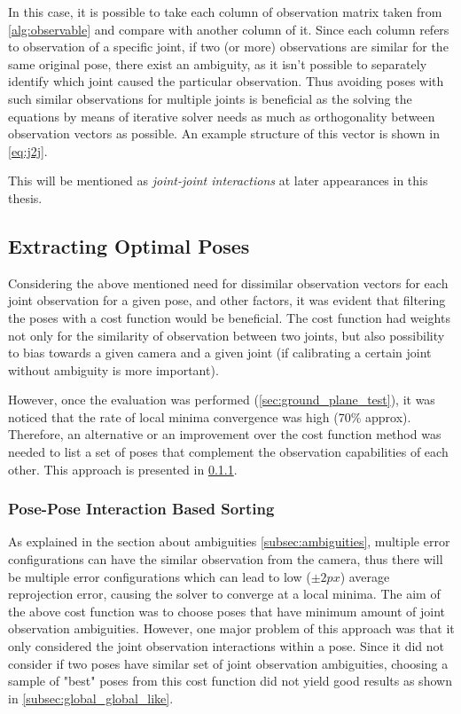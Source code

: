 \documentclass[english, printversion, nomenclature, notitle]{tuvisionthesis} %
\begin{document}
In this case, it is possible to take each column of observation matrix taken from \cref{alg:observable} and compare with another column of it. Since each column refers to observation of a specific joint, if two (or more) observations are similar for the same original pose, there exist an ambiguity, as it isn't possible to separately identify which joint caused the particular observation. Thus avoiding poses with such similar observations for multiple joints is beneficial as the solving the equations by means of iterative solver needs as much as orthogonality between observation vectors as possible. An example structure of this vector is shown in \cref{eq:j2j}.

This will be mentioned as \textit{joint-joint interactions} at later appearances in this thesis.

\subsection{Extracting Optimal Poses}

Considering the above mentioned need for dissimilar observation vectors for each joint observation for a given pose, and other factors, it was evident that filtering the poses with a cost function would be beneficial. The cost function had weights not only for the similarity of observation between two joints, but also possibility to bias towards a given camera and a given joint (if calibrating a certain joint without ambiguity is more important).

However, once the evaluation was performed (\cref{sec:ground_plane_test}), it was noticed that the rate of local minima convergence was high (70\% approx). Therefore, an alternative or an improvement over the cost function method was needed to list a set of poses that complement the observation capabilities of each other. This approach is presented in \cref{subsec:posepose}.

\subsubsection{Pose-Pose Interaction Based Sorting}
\label{subsec:posepose}

As explained in the section about ambiguities \cref{subsec:ambiguities}, multiple error configurations can have the similar observation from the camera, thus there will be multiple error configurations which can lead to low ($\pm2px$) average reprojection error, causing the solver to converge at a local minima. The aim of the above cost function was to choose poses that have minimum amount of joint observation ambiguities. However, one major problem of this approach was that it only considered the joint observation interactions within a pose. Since it did not consider if two poses have similar set of joint observation ambiguities, choosing a sample of "best" poses from this cost function did not yield good results as shown in \cref{subsec:global_global_like}.
\end{document}
